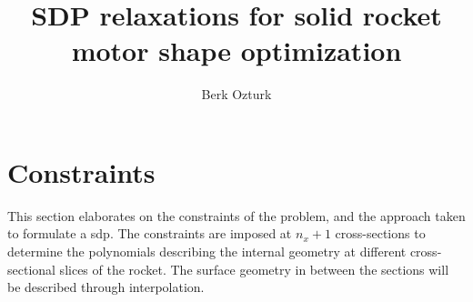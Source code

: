 \documentclass[11pt]{article}
\begin{document}
    \title{SDP relaxations for solid rocket motor shape optimization}
    \author{Berk Ozturk}
    \maketitle

    

    

    

    

    \section{Constraints}

    This section elaborates on the constraints of the problem, and the approach taken to formulate a \gls{sdp}.
    The constraints are imposed at $n_x+1$ cross-sections to determine the polynomials describing
    the internal geometry at different cross-sectional slices of the rocket.
    The surface geometry in between the sections will be described through interpolation.
\end{document}
